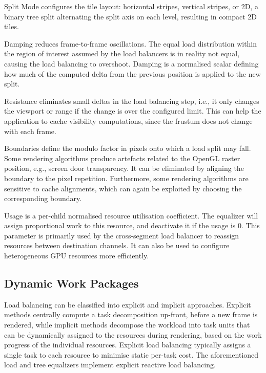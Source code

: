 \begin{compactdesc}
\item[Split Mode] configures the tile layout: horizontal stripes, vertical stripes,
or 2D, a binary tree split alternating the split axis on each level, resulting
in compact 2D tiles.
\item[Damping] reduces frame-to-frame oscillations. The equal load distribution
within the region of interest assumed by the load balancers is in reality not
equal, causing the load balancing to overshoot. Damping is a normalised scalar
defining how much of the computed delta from the previous position is applied to
the new split.

\item[Resistance] eliminates small deltas in the load balancing step, i.e., it
only changes the viewport or range if the change is over the configured limit.
This can help the application to cache visibility computations, since the
frustum does not change with each frame.

\item[Boundaries] define the modulo factor in pixels onto which a load split may
fall. Some rendering algorithms produce artefacts related to the OpenGL raster
position, e.g., screen door transparency. It can be eliminated by aligning
the boundary to the pixel repetition. Furthermore, some rendering algorithms are
sensitive to cache alignments, which can again be exploited by choosing the
corresponding boundary.

\item[Usage] is a per-child normalised resource utilisation coefficient. The
equalizer will assign proportional work to this resource, and deactivate it if
the usage is 0. This parameter is primarily used by the cross-segment load
balancer to reassign resources between destination channels. It can also be
used to configure heterogeneous GPU resources more efficiently.

\end{compactdesc}

\subsection{Dynamic Work Packages}

Load balancing can be classified into explicit and implicit approaches.
Explicit methods centrally compute a task decomposition up-front, before a new
frame is rendered, while implicit methods decompose the workload into task
units that can be dynamically assigned to the resources during rendering, based
on the work progress of the individual resources. Explicit load balancing
typically assigns a single task to each resource to minimise static per-task
cost. The aforementioned load and tree equalizers implement explicit reactive load
balancing.

